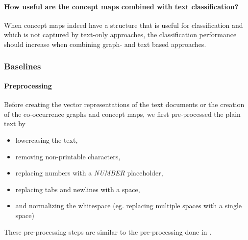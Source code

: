 \paragraph{How useful are the concept maps combined with text classification?}
When concept maps indeed have a structure that is useful for classification and which is not captured by text-only approaches, the classification performance should increase when combining graph- and text based approaches.


\subsubsection{Baselines}
\paragraph{Preprocessing}
Before creating the vector representations of the text documents or the creation of the co-occurrence graphs and concept maps, we first pre-processed the plain text by

\begin{itemize}
\item{lowercasing the text,}
\item{removing non-printable characters,}
\item{replacing numbers with a \textit{NUMBER} placeholder,}
\item{replacing tabs and newlines with a space,}
\item{and normalizing the whitespace (eg. replacing multiple spaces with a single space)}
\end{itemize}
These pre-processing steps are similar to the pre-processing done in \cite{Cachopo2007}.


